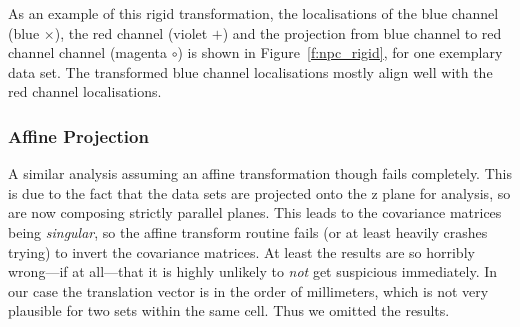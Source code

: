 \documentclass[11pt, a4paper, oneside, twocolumn]{report}
\newcommand{\e}{\emph}
\begin{document}
As an example of this rigid transformation, the localisations of the
blue channel (blue $\times$), the red channel (violet $+$) and the
projection from blue channel to red channel channel (magenta $\circ$)
is shown in Figure~\ref{f:npc_rigid}, for one exemplary data set. The
transformed blue channel localisations mostly align well with the red
channel localisations.


\subsubsection{Affine Projection}\label{s:r:dcnpca}

A similar analysis assuming an affine transformation though fails
completely. This is due to the fact that the data sets are projected
onto the z plane for analysis, so are now composing strictly parallel
planes. This leads to the covariance matrices being \e{singular}, so
the affine transform routine fails (or at least heavily crashes
trying) to invert the covariance matrices. At least the results are so
horribly wrong---if at all---that it is highly unlikely to \e{not} get
suspicious immediately. In our case the translation vector is in the
order of millimeters, which is not very plausible for two sets within
the same cell. Thus we omitted the results.

\clearpage
\onecolumn
\end{document}
